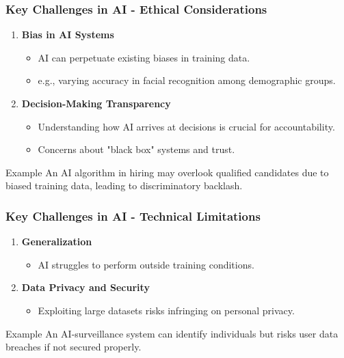 \documentclass[aspectratio=169]{beamer}
\begin{document}
\begin{frame}[fragile]
    \frametitle{Key Challenges in AI - Ethical Considerations}
    \begin{enumerate}
        \item \textbf{Bias in AI Systems}
        \begin{itemize}
            \item AI can perpetuate existing biases in training data.
            \item e.g., varying accuracy in facial recognition among demographic groups.
        \end{itemize}
        
        \item \textbf{Decision-Making Transparency}
        \begin{itemize}
            \item Understanding how AI arrives at decisions is crucial for accountability.
            \item Concerns about "black box" systems and trust.
        \end{itemize}
    \end{enumerate}
    
    \begin{block}{Example}
    An AI algorithm in hiring may overlook qualified candidates due to biased training data, leading to discriminatory backlash.
    \end{block}
\end{frame}

\begin{frame}[fragile]
    \frametitle{Key Challenges in AI - Technical Limitations}
    \begin{enumerate}
        \item \textbf{Generalization}
        \begin{itemize}
            \item AI struggles to perform outside training conditions.
        \end{itemize}
        
        \item \textbf{Data Privacy and Security}
        \begin{itemize}
            \item Exploiting large datasets risks infringing on personal privacy.
        \end{itemize}
    \end{enumerate}
    
    \begin{block}{Example}
    An AI-surveillance system can identify individuals but risks user data breaches if not secured properly.
    \end{block}
\end{frame}
\end{document}
